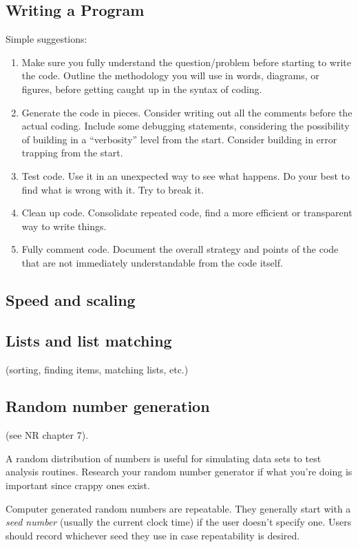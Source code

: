 \documentclass{article}
\begin{document}
\subsection{Writing a Program}
Simple suggestions:
\begin{enumerate}
    \item Make sure you fully understand the question/problem before
        starting to write the code. Outline the methodology you will
        use in words, diagrams,
        or figures, before getting caught up in the syntax of coding.
    \item Generate the code in pieces. Consider writing out all the comments
        before the actual coding. Include some debugging statements, considering
        the possibility of building in a ``verbosity'' level from the start.
        Consider building in error trapping from the start.
    \item Test code. Use it in an unexpected way to see what happens. Do your
        best to find what is wrong with it. Try to break it.
    \item Clean up code. Consolidate repeated code, find a more efficient
        or transparent way to write things.
    \item Fully comment code. Document the overall strategy and points of the
        code that are not immediately understandable from the code itself.
\end{enumerate}

\subsection{Speed and scaling}
\subsection{Lists and list matching}
(sorting, finding items, matching lists, etc.)

\subsection{Random number generation}
(see NR chapter 7).

A random distribution of numbers is useful for simulating data sets to test
analysis routines. Research your random number generator if what you're doing
is important since crappy ones exist.

Computer generated random numbers are repeatable. They generally start with a
\emph{seed number} (usually the current clock time) if the user doesn't specify
one. Users should record whichever seed they use in case repeatability is
desired.
\end{document}
